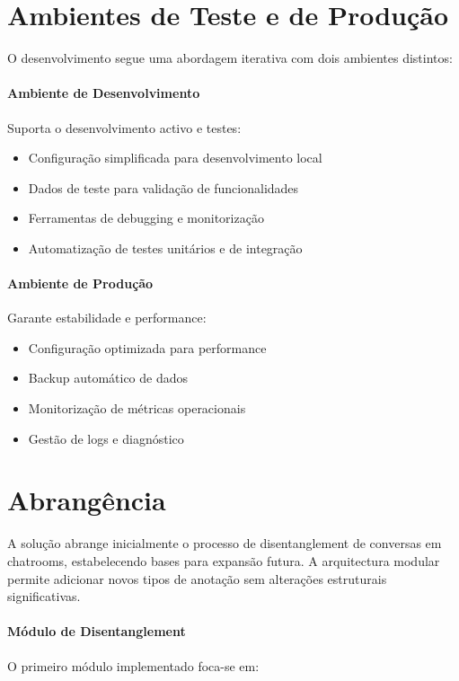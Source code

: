 \section{Ambientes de Teste e de Produção}

O desenvolvimento segue uma abordagem iterativa com dois ambientes distintos:

\paragraph{Ambiente de Desenvolvimento}
Suporta o desenvolvimento activo e testes:

\begin{itemize}
    \item Configuração simplificada para desenvolvimento local
    \item Dados de teste para validação de funcionalidades
    \item Ferramentas de debugging e monitorização
    \item Automatização de testes unitários e de integração
\end{itemize}

\paragraph{Ambiente de Produção}
Garante estabilidade e performance:

\begin{itemize}
    \item Configuração optimizada para performance
    \item Backup automático de dados
    \item Monitorização de métricas operacionais
    \item Gestão de logs e diagnóstico
\end{itemize}

\section{Abrangência}

A solução abrange inicialmente o processo de disentanglement de conversas em chatrooms, estabelecendo bases para expansão futura. A arquitectura modular permite adicionar novos tipos de anotação sem alterações estruturais significativas.

\paragraph{Módulo de Disentanglement}
O primeiro módulo implementado foca-se em:

